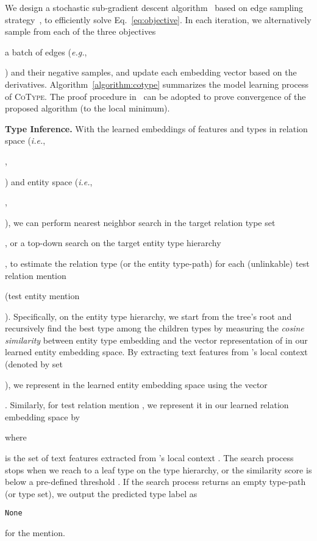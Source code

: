 \documentclass[letterpaper]{sig-alternate-2013}
\def\ie{{\sl i.e.}}
\def\eg{{\sl e.g.}}
\begin{document}
We design a stochastic sub-gradient descent algorithm~\cite{shalev2011pegasos} based on edge sampling strategy~\cite{tang2015line}, to efficiently solve Eq.~\eqref{eq:objective}. In each iteration, we alternatively sample from each of the three objectives \begin{small}\end{small} a batch of edges (\eg, \begin{small}\end{small}) and their negative samples, and update each embedding vector based on the derivatives.
Algorithm~\ref{algorithm:cotype} summarizes the model learning process of \textsc{CoType}. The proof procedure in~\cite{shalev2011pegasos} can be adopted to prove convergence of the proposed algorithm (to the local minimum).





\smallskip
\noindent \textsf{\small \textbf{Type Inference.}}
With the learned embeddings of features and types in relation space (\ie, \begin{small}, \end{small}) and entity space (\ie, \begin{small}, \end{small}), we can perform nearest neighbor search in the target relation type set \begin{small}\end{small}, or a top-down search on the target entity type hierarchy \begin{small}\end{small}, to estimate the relation type (or the entity type-path) for each (unlinkable) test relation mention \begin{small}\end{small} (test entity mention \begin{small}\end{small}). Specifically, on the entity type hierarchy, we start from the tree's root and recursively find the best type among the children types by measuring the \textit{cosine similarity} between entity type embedding and the vector representation of  in our learned entity embedding space. By extracting text features from 's local context (denoted by set \begin{small}\end{small}), we represent  in the learned entity embedding space using the vector \begin{small}\end{small}.  Similarly, for test relation mention , we represent it in our learned relation embedding space by \begin{small}\end{small} where \begin{small}\end{small} is the set of text features extracted from 's local context . The search process stops when we reach to a leaf type on the type hierarchy, or the similarity score is below a pre-defined threshold . If the search process returns an empty type-path (or type set), we output the predicted type label as \begin{small}\texttt{None}\end{small} for the mention.
\end{document}
